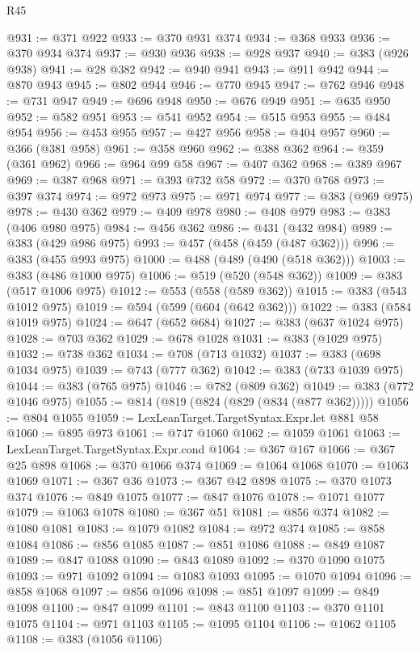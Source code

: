 \begin{lexlean}{R45}
\begin{coremodule}
@931 := @371 @922
@933 := @370 @931 @374
@934 := @368 @933
@936 := @370 @934 @374
@937 := @930 @936
@938 := @928 @937
@940 := @383 (@926 @938)
@941 := @28 @382
@942 := @940 @941
@943 := @911 @942
@944 := @870 @943
@945 := @802 @944
@946 := @770 @945
@947 := @762 @946
@948 := @731 @947
@949 := @696 @948
@950 := @676 @949
@951 := @635 @950
@952 := @582 @951
@953 := @541 @952
@954 := @515 @953
@955 := @484 @954
@956 := @453 @955
@957 := @427 @956
@958 := @404 @957
@960 := @366 (@381 @958)
@961 := @358 @960
@962 := @388 @362
@964 := @359 (@361 @962)
@966 := @964 @99 @58
@967 := @407 @362
@968 := @389 @967
@969 := @387 @968
@971 := @393 @732 @58
@972 := @370 @768
@973 := @397 @374
@974 := @972 @973
@975 := @971 @974
@977 := @383 (@969 @975)
@978 := @430 @362
@979 := @409 @978
@980 := @408 @979
@983 := @383 (@406 @980 @975)
@984 := @456 @362
@986 := @431 (@432 @984)
@989 := @383 (@429 @986 @975)
@993 := @457 (@458 (@459 (@487 @362)))
@996 := @383 (@455 @993 @975)
@1000 := @488 (@489 (@490 (@518 @362)))
@1003 := @383 (@486 @1000 @975)
@1006 := @519 (@520 (@548 @362))
@1009 := @383 (@517 @1006 @975)
@1012 := @553 (@558 (@589 @362))
@1015 := @383 (@543 @1012 @975)
@1019 := @594 (@599 (@604 (@642 @362)))
@1022 := @383 (@584 @1019 @975)
@1024 := @647 (@652 @684)
@1027 := @383 (@637 @1024 @975)
@1028 := @703 @362
@1029 := @678 @1028
@1031 := @383 (@1029 @975)
@1032 := @738 @362
@1034 := @708 (@713 @1032)
@1037 := @383 (@698 @1034 @975)
@1039 := @743 (@777 @362)
@1042 := @383 (@733 @1039 @975)
@1044 := @383 (@765 @975)
@1046 := @782 (@809 @362)
@1049 := @383 (@772 @1046 @975)
@1055 := @814 (@819 (@824 (@829 (@834 (@877 @362)))))
@1056 := @804 @1055
@1059 := LexLeanTarget.TargetSyntax.Expr.let @881 @58
@1060 := @895 @973
@1061 := @747 @1060
@1062 := @1059 @1061
@1063 := LexLeanTarget.TargetSyntax.Expr.cond
@1064 := @367 @167
@1066 := @367 @25 @898
@1068 := @370 @1066 @374
@1069 := @1064 @1068
@1070 := @1063 @1069
@1071 := @367 @36
@1073 := @367 @42 @898
@1075 := @370 @1073 @374
@1076 := @849 @1075
@1077 := @847 @1076
@1078 := @1071 @1077
@1079 := @1063 @1078
@1080 := @367 @51
@1081 := @856 @374
@1082 := @1080 @1081
@1083 := @1079 @1082
@1084 := @972 @374
@1085 := @858 @1084
@1086 := @856 @1085
@1087 := @851 @1086
@1088 := @849 @1087
@1089 := @847 @1088
@1090 := @843 @1089
@1092 := @370 @1090 @1075
@1093 := @971 @1092
@1094 := @1083 @1093
@1095 := @1070 @1094
@1096 := @858 @1068
@1097 := @856 @1096
@1098 := @851 @1097
@1099 := @849 @1098
@1100 := @847 @1099
@1101 := @843 @1100
@1103 := @370 @1101 @1075
@1104 := @971 @1103
@1105 := @1095 @1104
@1106 := @1062 @1105
@1108 := @383 (@1056 @1106)

\end{coremodule}
\end{lexlean}
